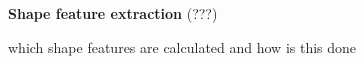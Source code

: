 \textbf{Shape feature extraction}  (???)

which shape features are calculated and how is this done
    